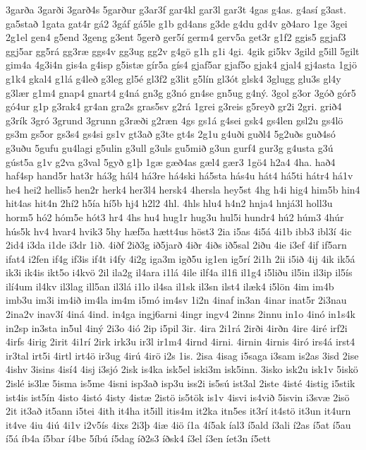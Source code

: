{3garða
3garði
3garð4s
5garður
g3ar3f
gar4kl
gar3l
gar3t
4gas
g4as.
g4así
g3ast.
ga5stað
1gata
gat4r
gá2
3gáf
gá5le
g1b
gd4ans
g3de
g4du
gd4v
gð4aro
1ge
3gei
2g1el
gen4
g5end
3geng
g3ent
5gerð
ger5í
germ4
gerv5a
get3r
g1f2
ggis5
ggjaf3
ggj5ar
gg5rá
gg3ræ
ggs4v
gg3ug
gg2v
g4gö
g1h
g1i
4gi.
4gik
gi5kv
3gild
g5ill
5gilt
gim4a
4g3i4n
gis4a
g4isp
g5istæ
gír5a
gís4
gjaf5ar
gjaf5o
gjak4
gjal4
gj4asta
1gjö
g1k4
gkal4
g1lá
g4leð
g3leg
gl5é
gl3f2
g3lit
g5lín
gl3ót
glsk4
3glugg
glu3s
gl4y
g3lær
g1m4
gnap4
gnart4
g4ná
gn3g
g3nó
gn4se
gn5ug
g4ný.
3gol
g3or
3góð
gór5
gó4ur
g1p
g3rak4
gr4an
gra2s
gras5sv
g2rá
1grei
g3reis
g5reyð
gr2i
2gri.
grið4
g3rík
3gró
3grund
3grunn
g3ræði
g2ræn
4gs
gs1á
g4sei
gsk4
gs4len
gsl2u
gs4lö
gs3m
gs5or
gs3s4
gs4si
gs1v
gt3að
g3te
gt4s
2g1u
g4uði
guðl4
5g2uðs
guð4só
g3uðu
5gufu
gu4lagi
g5ulin
g3ull
g3uls
gu5mið
g3un
gurf4
gur3g
g4usta
g3ú
gúst5a
g1v
g2va
g3val
5gyð
g1þ
1gæ
gæð4as
gæl4
gær3
1gö4
h2a4
4ha.
hað4
haf4sp
hand5r
hat3r
há3g
hál4
há3re
há4ski
há5sta
hás4u
hát4
há5ti
hátr4
há1v
he4
hei2
hellis5
hen2r
herk4
her3l4
hersk4
4hersla
hey5st
4hg
h4i
hig4
him5b
hin4
hit4as
hit4n
2hí2
h5ía
hí5b
hj4
h2l2
4hl.
4hls
hlu4
h4n2
hnja4
hnjá3l
holl3u
horm5
hó2
hóm5e
hót3
hr4
4hs
hu4
hug1r
hug3u
hul5i
hundr4
hú2
húm3
4húr
hús5k
hv4
hvar4
hvik3
5hy
hæf5a
hætt4us
höst3
2ia
i5as
4i5á
4i1b
ibb3
ibl3í
4ic
2id4
i3da
i1de
i3dr
1ið.
4iðf
2ið3g
ið5jarð
4iðr
4iðs
ið5sal
2iðu
4ie
i3ef
4if
if5arn
ifat4
i2fen
if4g
if3is
if4t
i4fy
4i2g
iga3m
igð5u
ig1en
ig5rí
2i1h
2ii
i5ið
4ij
4ik
ik5á
ik3i
ik4is
ikt5o
i4kvö
2il
ila2g
il4ara
i1lá
4ile
ilf4a
il1fi
il1g4
i5liðu
il5in
il3ip
il5ís
ilí4um
il4kv
il3lag
ill5an
il3lá
i1lo
il4sa
il1sk
il3sn
ilst4
ilæk4
i5lön
4im
im4b
imb3u
im3i
im4ið
im4la
im4m
i5mó
im4sv
1i2n
4inaf
in3an
4inar
inat5r
2i3nau
2ina2v
inav3í
4iná
4ind.
in4ga
ingj6arni
4ingr
ingv4
2inns
2innu
in1o
4inó
in1s4k
in2sp
in3sta
in5ul
4iný
2i3o
4ió
2ip
i5pil
3ir.
4ira
2i1rá
2irði
4irðn
4ire
4iré
irf2i
4irfs
4irig
2irit
4i1rí
2irk
irk3u
ir3l
ir1m4
4irnd
4irni.
4irnin
4irnis
4iró
irs4á
irst4
ir3tal
irt5i
4irtl
irt4ö
ir3ug
4irú
4irö
i2s
1is.
2isa
4isag
i5saga
i3sam
is2as
3isd
2ise
4ishv
3isins
4isí4
4isj
i3sjó
2isk
is4ka
isk5el
iski3m
isk5inn.
3isko
isk2u
isk1v
5iskö
2islé
is3læ
5isma
is5me
4isni
isp3að
isp3u
iss2i
is5sú
ist3al
2iste
4isté
4istig
i5stik
ist4is
ist5ín
4isto
4istó
4isty
4istæ
2istö
is5tök
is1v
4isvi
is4við
5isvin
i3svæ
2isö
2it
it3að
it5ann
i5tei
4ith
it4ha
it5ill
itis4m
it2ka
itn5es
it3rí
it4stö
it3un
it4urn
it4ve
4iu
4iú
4i1v
i2v5ís
4ixs
2i3þ
4iæ
4iö
í1a
4í5ak
íal3
í5ald
í3ali
í2as
í5at
í5au
í5á
íb4a
í5bar
í4be
5íbú
í5dag
íð2s3
íðsk4
í3el
í3en
íet3n
í5ett
}
